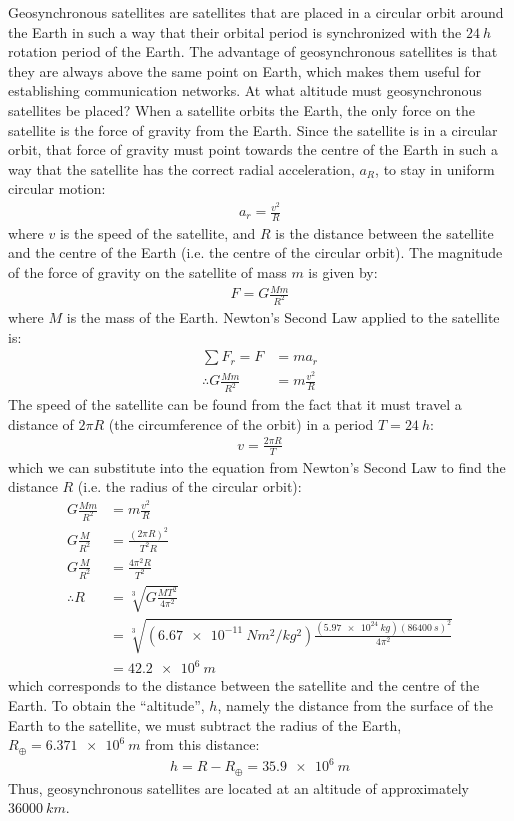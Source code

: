 \begin{example}{\label{ex:gravity:geosyncorbit}Geosynchronous satellites are satellites that are placed in a circular orbit around the Earth in such a way that their orbital period is synchronized with the $\SI{24}{h}$ rotation period of the Earth. The advantage of geosynchronous satellites is that they are always above the same point on Earth, which makes them useful for establishing communication networks. At what altitude must geosynchronous satellites be placed?}
When a satellite orbits the Earth, the only force on the satellite is the force of gravity from the Earth. Since the satellite is in a circular orbit, that force of gravity must point towards the centre of the Earth in such a way that the satellite has the correct radial acceleration, $a_R$, to stay in uniform circular motion:
\begin{align*}
a_r=\frac{v^2}{R}
\end{align*}
where $v$ is the speed of the satellite, and $R$ is the distance between the satellite and the centre of the Earth (i.e. the centre of the circular orbit). The magnitude of the force of gravity on the satellite of mass $m$ is given by:
\begin{align*}
F = G\frac{Mm}{R^2}
\end{align*}
where $M$ is the mass of the Earth. Newton's Second Law applied to the satellite is:
\begin{align*}
\sum F_r = F &= ma_r\\
\therefore G\frac{Mm}{R^2}&=m\frac{v^2}{R}
\end{align*}
The speed of the satellite can be found from the fact that it must travel a distance of $2\pi R$ (the circumference of the orbit) in a period $T=\SI{24}{h}$:
\begin{align*}
v=\frac{2\pi R}{T}
\end{align*}
which we can substitute into the equation from Newton's Second Law to find the distance $R$ (i.e. the radius of the circular orbit):
\begin{align*}
G\frac{Mm}{R^2}&=m\frac{v^2}{R}\\
G\frac{M}{R^2}&=\frac{(2\pi R)^2}{T^2R}\\ 
G\frac{M}{R^2}&=\frac{4\pi^2 R}{T^2}\\ 
\therefore R&=\sqrt[3]{G\frac{MT^2}{4\pi^2}}\\
&=\sqrt[3]{(\SI{6.67e-11}{Nm^2/kg^2})\frac{(\SI{5.97e24}{kg})(\SI{86400}{s})^2}{4\pi^2}}\\
&=\SI{42.2e6}{m}
\end{align*}
which corresponds to the distance between the satellite and the centre of the Earth. To obtain the ``altitude'', $h$, namely the distance from the surface of the Earth to the satellite, we must subtract the radius of the Earth, $R_\oplus=\SI{6.371e6}{m}$ from this distance:
\begin{align*}
h = R-R_\oplus = \SI{35.9e6}{m}
\end{align*}
Thus, geosynchronous satellites are located at an altitude of approximately $\SI{36000}{km}$.


\end{example}
